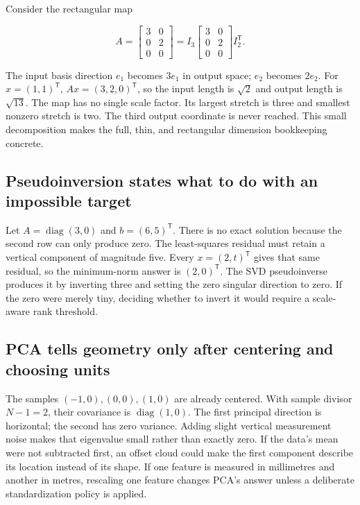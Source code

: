 Consider the rectangular map

\[
A=\begin{bmatrix}3&0\\0&2\\0&0\end{bmatrix}
=I_3\begin{bmatrix}3&0\\0&2\\0&0\end{bmatrix}I_2^\mathsf T.
\]

The input basis direction \(e_1\) becomes \(3e_1\) in output space; \(e_2\) becomes \(2e_2\). For \(x=(1,1)^\mathsf T\), \(Ax=(3,2,0)^\mathsf T\), so the input length is \(\sqrt2\) and output length is \(\sqrt{13}\). The map has no single scale factor. Its largest stretch is three and smallest nonzero stretch is two. The third output coordinate is never reached. This small decomposition makes the full, thin, and rectangular dimension bookkeeping concrete.

\subsection{Pseudoinversion states what to do with an impossible target}\label{02-foundations-ii-ch038-pseudoinversion-states-what-to-do-with-an-impossible-target}

Let \(A=\operatorname{diag}(3,0)\) and \(b=(6,5)^\mathsf T\). There is no exact solution because the second row can only produce zero. The least-squares residual must retain a vertical component of magnitude five. Every \(x=(2,t)^\mathsf T\) gives that same residual, so the minimum-norm answer is \((2,0)^\mathsf T\). The SVD pseudoinverse produces it by inverting three and setting the zero singular direction to zero. If the zero were merely tiny, deciding whether to invert it would require a scale-aware rank threshold.

\subsection{PCA tells geometry only after centering and choosing units}\label{02-foundations-ii-ch038-pca-tells-geometry-only-after-centering-and-choosing-units}

The samples \((-1,0),(0,0),(1,0)\) are already centered. With sample divisor \(N-1=2\), their covariance is \(\operatorname{diag}(1,0)\). The first principal direction is horizontal; the second has zero variance. Adding slight vertical measurement noise makes that eigenvalue small rather than exactly zero. If the data's mean were not subtracted first, an offset cloud could make the first component describe its location instead of its shape. If one feature is measured in millimetres and another in metres, rescaling one feature changes PCA's answer unless a deliberate standardization policy is applied.

